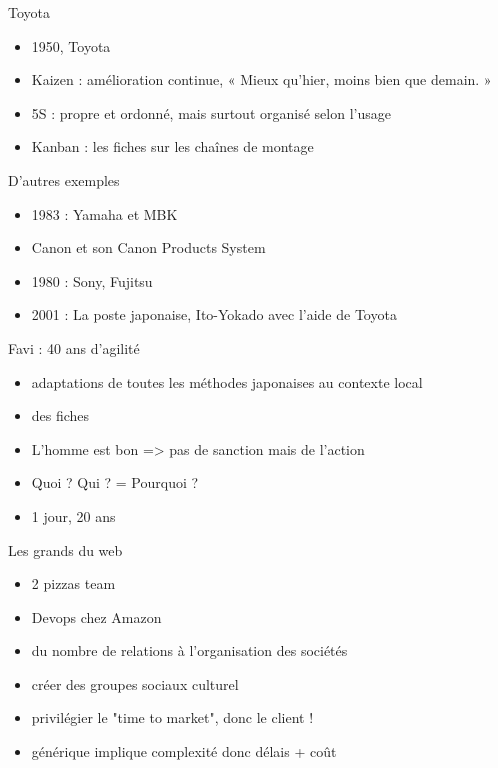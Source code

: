 \documentclass{beamer}
\begin{document}
\begin{frame}{Toyota}
  \begin{itemize}
    \item 1950, Toyota
    \item Kaizen : amélioration continue, « Mieux qu'hier, moins bien que demain. »
    \item 5S : propre et ordonné, mais surtout organisé selon l'usage
    \item Kanban : les fiches sur les chaînes de montage 
  \end{itemize}
\end{frame}

\begin{frame}{D'autres exemples}
  \begin{itemize}
    \item 1983 : Yamaha et MBK
    \item Canon et son Canon Products System
    \item 1980 : Sony, Fujitsu
    \item 2001 : La poste japonaise, Ito-Yokado avec l'aide de Toyota
  \end{itemize}
\end{frame}

\begin{frame}{Favi : 40 ans d'agilité}
  \begin{itemize}
    \item adaptations de toutes les méthodes japonaises au contexte local
    \item des fiches
    \item L'homme est bon => pas de sanction mais de l'action
    \item Quoi ? Qui ? = Pourquoi ?
    \item 1 jour, 20 ans
  \end{itemize}
\end{frame}

\begin{frame}{Les grands du web}
  \begin{itemize}
    \item 2 pizzas team
    \item Devops chez Amazon
    \item du nombre de relations à l'organisation des sociétés
    \item créer des groupes sociaux culturel
    \item privilégier le "time to market", donc le client !
    \item générique implique complexité donc délais + coût
  \end{itemize}
\end{frame}
\end{document}
